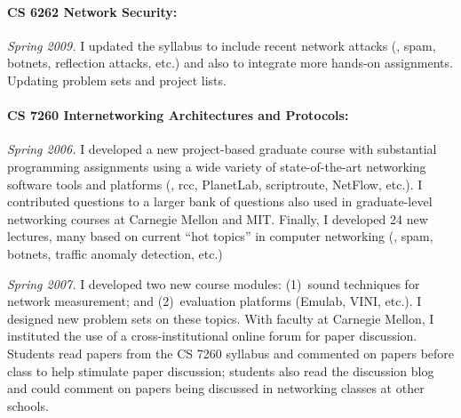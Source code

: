 \paragraph{CS 6262 Network Security:}
{\em Spring 2009.} I updated the syllabus to
include recent network attacks (\eg, spam, botnets, reflection attacks,
etc.) and also to integrate more hands-on assignments.  Updating problem
sets and project lists.

\paragraph{CS 7260 Internetworking Architectures and Protocols:}
{\em Spring 2006.}  I developed a new project-based graduate course
with substantial programming assignments using a wide variety of
state-of-the-art networking software tools and platforms (\eg, rcc,
PlanetLab, scriptroute, NetFlow, etc.).  I contributed questions to a
larger bank of questions also used in graduate-level networking courses
at Carnegie Mellon and MIT.  Finally, I developed 24 new lectures, many
based on current ``hot topics'' in computer networking (\eg, spam,
botnets, traffic anomaly detection, etc.)

{\em Spring 2007.}  I developed two new course modules: (1)~sound
techniques for network measurement; and (2)~evaluation platforms
(Emulab, VINI, etc.).  I designed new problem sets on these topics.
With faculty at Carnegie Mellon, I instituted the use of a
cross-institutional online forum for paper discussion.  Students read
papers from the CS 7260 syllabus and commented on papers before class to
help stimulate paper discussion; students also read the discussion blog
and could comment on papers being discussed in networking classes at
other schools.

\medskip


\def\student#1#2#3#4#5{\item[#1]{#2
\newline{\sl #3}
\internalonly{\newline Publications: {\sl #4}}
\newline {\sl #5}}}

\def\studentnopub#1#2#3#4#5{\item[#1]{#2
\newline {\sl #3}
\newline {\sl #5}
}}

\def\studentnonote#1#2#3#4{\item[#1]{#2
\newline{\sl #3}
\newline Publications: {\sl #4}}}


